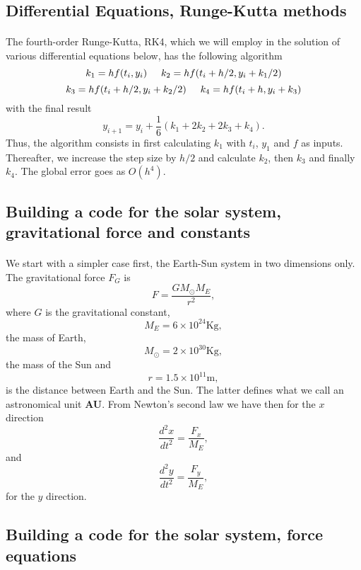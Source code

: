 \documentclass[%
oneside,                 %
final,                   %
10pt]{article}
\begin{document}
\subsection*{Differential Equations, Runge-Kutta methods}

\paragraph{}
The fourth-order Runge-Kutta, RK4, which we will employ in the solution of various differential equations below, has the following algorithm
\[
  k_1=hf(t_i,y_i) \hspace{0.5cm}   k_2=hf(t_i+h/2,y_i+k_1/2)
\]
\[
  k_3=hf(t_i+h/2,y_i+k_2/2)\hspace{0.5cm}   k_4=hf(t_i+h,y_i+k_3)
\]
with the final result
\[
  y_{i+1}=y_i +\frac{1}{6}\left( k_1 +2k_2+2k_3+k_4\right).
\]
Thus, the algorithm consists in first calculating $k_1$ 
with $t_i$, $y_1$ and $f$ as inputs. Thereafter, we increase the step
size by $h/2$ and calculate $k_2$, then $k_3$ and finally $k_4$. The global error goes as $O(h^4)$.



\subsection*{Building a code for the solar system, gravitational force and constants}

\paragraph{}
We start with a simpler case first, the Earth-Sun system  in two dimensions only.  The gravitational force $F_G$ is  
  \[
      F=\frac{GM_{\odot}M_E}{r^2},
  \]
where $G$ is the gravitational constant, 
\[
M_E=6\times 10^{24}\mathrm{Kg},
\]
the mass of Earth, 
\[
M_{\odot}=2\times 10^{30}\mathrm{Kg}, 
\]
the mass of the Sun and 
\[
r=1.5\times 10^{11}\mathrm{m}, 
\]
is the distance between Earth and the Sun. The latter defines what we call an astronomical unit \textbf{AU}.
From Newton's second law we have then for the $x$ direction
  \[
   \frac{d^2x}{dt^2}=\frac{F_{x}}{M_E},
  \]
and
  \[
   \frac{d^2y}{dt^2}=\frac{F_{y}}{M_E},
  \]
for the $y$ direction.




\subsection*{Building a code for the solar system, force equations}
\end{document}
